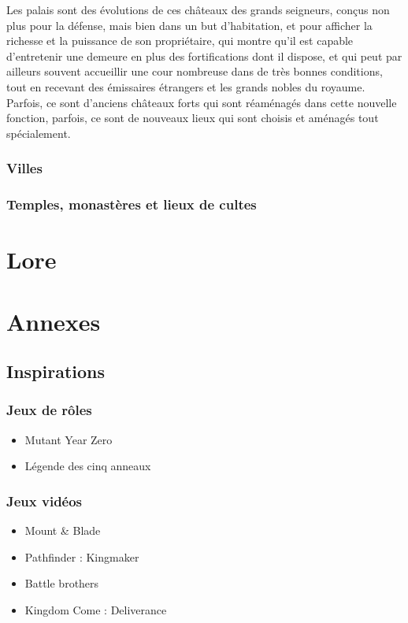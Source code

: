 \documentclass[10pt,a4paper]{book}
\begin{document}
\begin{multicols}{2}
Les palais sont des évolutions de ces châteaux des grands seigneurs, conçus non plus pour la défense, mais bien dans un but d'habitation, et pour afficher la richesse et la puissance de son propriétaire, qui montre qu'il est capable d'entretenir une demeure en plus des fortifications dont il dispose, et qui peut par ailleurs souvent accueillir une cour nombreuse dans de très bonnes conditions, tout en recevant des émissaires étrangers et les grands nobles du royaume. Parfois, ce sont d'anciens châteaux forts qui sont réaménagés dans cette nouvelle fonction, parfois, ce sont de nouveaux lieux qui sont choisis et aménagés tout spécialement.


\subsection{Villes}
\subsection{Temples, monastères et lieux de cultes}
\end{multicols}
\chapter{Lore}
\begin{multicols}{2}
\end{multicols}
\chapter*{Annexes}
\section*{Inspirations}
\subsection*{Jeux de rôles}
\begin{itemize}
\item Mutant Year Zero
\item Légende des cinq anneaux
\end{itemize}
\subsection*{Jeux vidéos}
\begin{itemize}
\item Mount \& Blade
\item Pathfinder : Kingmaker
\item Battle brothers
\item Kingdom Come : Deliverance
\end{itemize}
\end{document}
